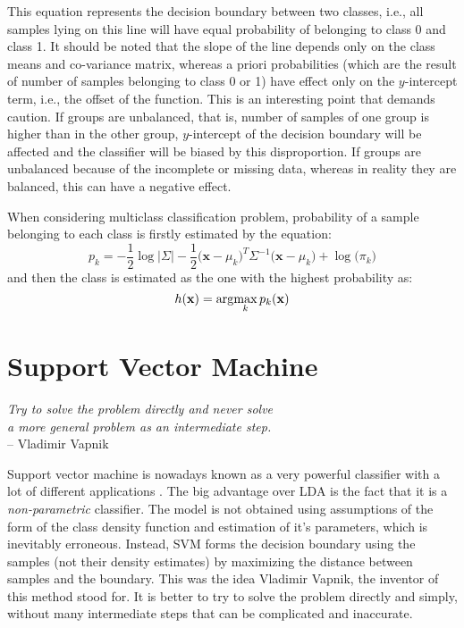 This equation represents the decision boundary between two classes, i.e., all samples lying on this line will have equal probability of belonging to class 0 and class 1. It should be noted that the slope of the line depends only on the class means and co-variance matrix, whereas a priori probabilities (which are the result of number of samples belonging to class 0 or 1) have effect only on the $y$-intercept term, i.e., the offset of the function. This is an interesting point that demands caution. If groups are unbalanced, that is, number of samples of one group is higher than in the other group, $y$-intercept of the decision boundary will be affected and the classifier will be biased by this disproportion. If groups are unbalanced because of the incomplete or missing data, whereas in reality they are balanced, this can have a negative effect.

When considering multiclass classification problem, probability of a sample belonging to each class is firstly estimated by the equation:
\begin{equation}
p_k = -\frac{1}{2} \log \big\vert \Sigma \big\vert - \frac{1}{2}  \Big(\mathbf{x}-\mu_k\Big)^T  \Sigma^{-1} \Big(\mathbf{x}-\mu_k\Big) +  \log{\Big(\pi_k\Big)}
\end{equation}
\noindent and then the class is estimated as the one with the highest probability as:
\begin{equation} 
h(\mathbf{x}) = \arg\!\max_k p_k(\mathbf{x})
\end{equation}


\section{Support Vector Machine}

\narrowlinespacing
\begin{myquote}
\begin{flushright}
\textit{Try to solve the problem directly and never solve \\a more general problem as an intermediate step.} \\-- Vladimir Vapnik
\end{flushright}
\end{myquote}
\normallinespacing

Support vector machine is nowadays known as a very powerful classifier with a lot of different applications \citep{Cortes1995}. The big advantage over LDA is the fact that it is a \emph{non-parametric} classifier. The model is not obtained using assumptions of the form of the class density function and estimation of it's parameters, which is inevitably erroneous. Instead, SVM forms the decision boundary using the samples (not their density estimates) by maximizing the distance between samples and the boundary.
This was the idea Vladimir Vapnik, the inventor of this method stood for. It is better to try to solve the problem directly and simply, without many intermediate steps that can be complicated and inaccurate.


